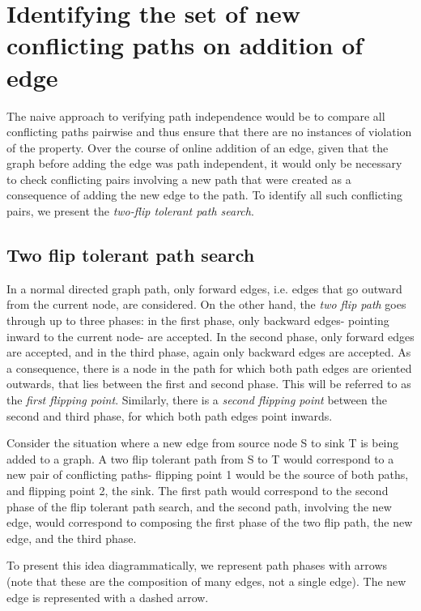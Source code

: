 \documentclass{article}
\begin{document}
\section{Identifying the set of new conflicting paths on addition of edge}

The naive approach to verifying path independence would be to compare all conflicting paths pairwise and thus ensure that there are no instances of violation of the property. Over the course of online addition of an edge, given that the graph before adding the edge was path independent, it would only be necessary to check conflicting pairs involving a new path that were created as a consequence of adding the new edge to the path.
To identify all such conflicting pairs, we present the \textit{two-flip tolerant path search}.

\subsection{Two flip tolerant path search}
In a normal directed graph path, only forward edges, i.e. edges that go outward from the current node, are considered. 
On the other hand, the \textit{two flip path} goes through up to three phases: in the first phase, only backward edges- pointing inward to the current node- are accepted. In the second phase, only forward edges are accepted, and in the third phase, again only backward edges are accepted. As a consequence, there is a node in the path for which both path edges are oriented outwards, that lies between the first and second phase. This will be referred to as the \textit{first flipping point}. Similarly, there is a \textit{second flipping point} between the second and third phase, for which both path edges point inwards.

Consider the situation where a new edge from source node S to sink T is being added to a graph.
A two flip tolerant path from S to T would correspond to a new pair of conflicting paths- flipping point 1 would be the source of both paths, and flipping point 2, the sink. The first path would correspond to the second phase of the flip tolerant path search, and the second path, involving the new edge, would correspond to composing the first phase of the two flip path, the new edge, and the third phase.

To present this idea diagrammatically, we represent path phases with arrows (note that these are the composition of many edges, not a single edge). The new edge is represented with a dashed arrow.
\end{document}
